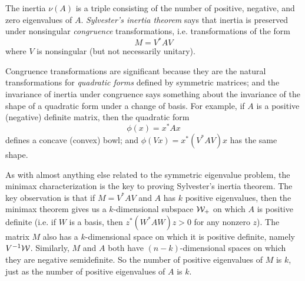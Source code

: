 \documentclass[12pt, leqno]{article} %
\begin{document}
The inertia $\nu(A)$ is a triple consisting of the number of positive,
negative, and zero eigenvalues of $A$.  {\em Sylvester's inertia
  theorem} says that inertia is preserved under nonsingular {\em
  congruence} transformations, i.e. transformations of the form
\[
  M = V^* A V
\]
where $V$ is nonsingular (but not necessarily unitary).

Congruence transformations are significant because they are the natural
transformations for {\em quadratic forms} defined by symmetric matrices;
and the invariance of inertia under congruence says something about the
invariance of the shape of a quadratic form under a change of basis.
For example, if $A$ is a positive (negative) definite matrix, then the
quadratic form
\[
  \phi(x) = x^* A x
\]
defines a concave (convex) bowl; and $\phi(Vx) = x^* (V^* A V) x$ has
the same shape.

As with almost anything else related to the symmetric eigenvalue
problem, the minimax characterization is the key to proving
Sylvester's inertia theorem.  The key observation is that if
$M = V^* A V$ and $A$ has $k$ positive eigenvalues, then the minimax theorem
gives us a $k$-dimensional subspace $\mathcal{W}_+$ on which $A$ is positive
definite (i.e. if $W$ is a basis, then $z^* (W^* A W) z > 0$ for any
nonzero $z$).  The matrix $M$ also has a $k$-dimensional space on
which it is positive definite, namely $V^{-1} \mathcal{W}$.  Similarly, $M$
and $A$ both have $(n-k)$-dimensional spaces on which they are
negative semidefinite.  So the number of positive eigenvalues of $M$
is $k$, just as the number of positive eigenvalues of $A$ is $k$.
\end{document}

